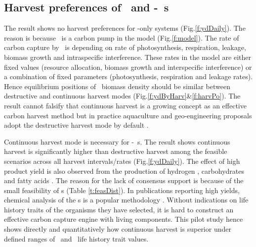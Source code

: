 \documentclass[../thesis.tex]{subfiles} %
\begin{document}
\subsection{Harvest preferences of \phy\ and \phy-\bac\ \pbs s}
The result shows no harvest preferences for \phy-only systems (Fig.\ref{f:ydDaily}).  The reason is because \phy\ is a carbon pump in the model (Fig.\ref{f:model}).  The rate of carbon capture by \phy\ is depending on rate of photosynthesis, respiration, leakage, biomass growth and intraspecific interference.  These rates in the model are either fixed values (resource allocation, biomass growth and interspecific interference) or a combination of fixed parameters (photosynthesis, respiration and leakage rates).  Hence equilibrium positions of \phy\ biomass density should be similar between destructive and continuous harvest modes (Fig.\ref{f:ydByHarv}\&\ref{f:harvPo}).  The result cannot falsify that continuous harvest is a growing concept as an effective carbon harvest method \autocite{fuentes2016impact} but in practice aquaculture and geo-engineering proposals adopt the destructive harvest mode by default \autocite{lawrence2014efficiency,krause2016substantial}.

Continuous harvest mode is necessary for \phy-\bac\ \pbs s.  The result shows continuous harvest is significantly higher than destructive harvest among the feasible scenarios across all harvest intervals/rates (Fig.\ref{f:ydDaily}).  The effect of high product yield is also observed from the production of hydrogen \autocite{kim2008anaerobic}, carbohydrates \autocite{choix2012enhanced1,choix2012enhanced2} and fatty acids \autocite{leyva2014accumulation}.  The reason for the lack of consensus support is because of the small feasibility of \pbs s (Table \ref{t:feasDist}).  In publications reporting high yields, chemical analysis of the \pbs s is a popular methodology \autocite{santos2014microalgal,rivas2010interactions,leyva2014accumulation,amin2009photolysis}.  Without indications on life history traits of the organisms they have selected, it is hard to construct an effective carbon capture engine with living components.  This pilot study hence shows directly and quantitatively how continuous harvest is superior under defined ranges of \phy\ and \bac\ life history trait values.
\end{document}
